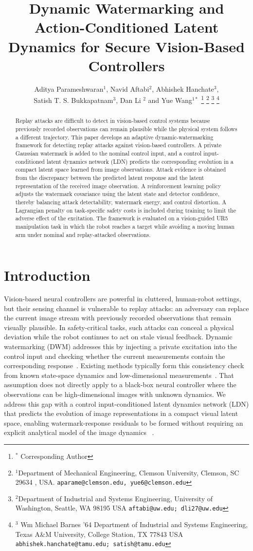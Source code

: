 \documentclass[letterpaper, 10 pt, conference]{ieeeconf}
\title{\LARGE \bf
Dynamic Watermarking and Action-Conditioned Latent Dynamics for Secure Vision-Based Controllers
}
\author{Aditya Parameshwaran$^{1}$, Navid Aftabi$^{2}$, Abhishek Hanchate$^{3}$, \\ Satish T. S. Bukkapatnam$^{3}$, Dan Li $^{2}$ 
and Yue Wang$^{1*}$%
\thanks{$^*$ Corresponding Author}
\thanks{$^{1}$Department of Mechanical Engineering, Clemson University, Clemson, SC 29634 , USA. {\tt\small aparame@clemson.edu, yue6@clemson.edu}}%
\thanks{$^{2}$Department of Industrial and Systems
Engineering, University of Washington, Seattle, WA 98195 USA {\tt\small aftabi@uw.edu; dli27@uw.edu}}%
\thanks{$^{3}$ Wm
Michael Barnes ’64 Department of Industrial and Systems Engineering, Texas A\&M University, College Station, TX 77843 USA {\tt\small abhishek.hanchate@tamu.edu; satish@tamu.edu}}%
}
\theoremstyle{plain}
\begin{document}
\maketitle
\thispagestyle{empty}
\pagestyle{empty}

\begin{abstract}
Replay attacks are difficult to detect in vision-based control systems because previously recorded observations can remain plausible while the physical system follows a different trajectory. This paper develops an adaptive dynamic-watermarking framework for detecting replay attacks against vision-based controllers. A private Gaussian watermark is added to the nominal control input, and a control input-conditioned latent dynamics network (LDN) predicts the corresponding evolution in a compact latent space learned from image observations. Attack evidence is obtained from the discrepancy between the predicted latent response and the latent representation of the received image observation. A reinforcement learning policy adjusts the watermark covariance using the latent state and detector confidence, thereby balancing attack detectability, watermark energy, and control distortion. A Lagrangian penalty on task-specific safety costs is included during training to limit the adverse effect of the excitation. The framework is evaluated on a vision-guided UR5 manipulation task in which the robot reaches a target while avoiding a moving human arm under nominal and replay-attacked observations.
\end{abstract}

\section{Introduction}
Vision-based neural controllers are powerful in cluttered, human-robot settings, but their sensing channel is vulnerable to replay attacks: an adversary can replace the current image stream with previously recorded observations that remain visually plausible. In safety-critical tasks, such attacks can conceal a physical deviation while the robot continues to act on stale visual feedback. Dynamic watermarking (DWM) addresses this by injecting a private excitation into the control input and checking whether the current measurements contain the corresponding response~\cite{mo2009secure,satchidanandan2017dynamic}. Existing methods typically form this consistency check from known state-space dynamics and low-dimensional measurements~\cite{porter2021generalized,naha2023sequential}. That assumption does not directly apply to a black-box neural controller where the observations can be high-dimensional images with unknown dynamics. We address this gap with a control input-conditioned latent dynamics network (LDN) that predicts the evolution of image representations in a compact visual latent space, enabling watermark-response residuals to be formed without requiring an explicit analytical model of the image dynamics ~\cite{parameshwaran2025sevin,wu2023daydreamer}. 
\end{document}
